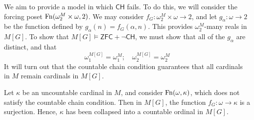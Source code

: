 We aim to provide a model in which \( \mathsf{CH} \) fails.
To do this, we will consider the forcing poset \( \operatorname{Fn}(\omega_2^M \times \omega, 2) \).
We may consider \( f_G : \omega_2^M \times \omega \to 2 \), and let \( g_\alpha : \omega \to 2 \) be the function defined by \( g_\alpha(n) = f_G(\alpha, n) \).
This provides \( \omega_2^M \)-many reals in \( M[G] \).
To show that \( M[G] \vDash \mathsf{ZFC} + \neg\mathsf{CH} \), we must show that all of the \( g_\alpha \) are distinct, and that
\[ \omega_1^{M[G]} = \omega_1^M;\quad \omega_2^{M[G]} = \omega_2^M \]
It will turn out that the countable chain condition guarantees that all cardinals in \( M \) remain cardinals in \( M[G] \).
\begin{example}
    Let \( \kappa \) be an uncountable cardinal in \( M \), and consider \( \operatorname{Fn}(\omega, \kappa) \), which does not satisfy the countable chain condition.
    Then in \( M[G] \), the function \( f_G : \omega \to \kappa \) is a surjection.
    Hence, \( \kappa \) has been collapsed into a countable ordinal in \( M[G] \).
\end{example}

